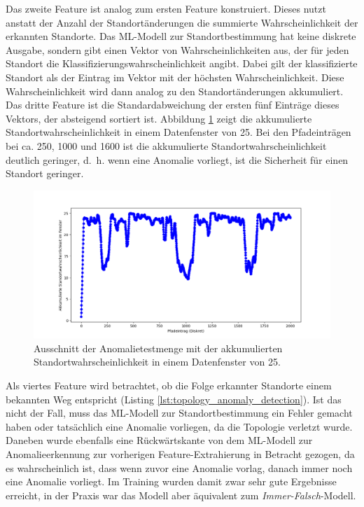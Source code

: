 \newline
\newline
Das zweite Feature ist analog zum ersten Feature konstruiert.
Dieses nutzt anstatt der Anzahl der Standortänderungen die summierte Wahrscheinlichkeit der erkannten Standorte.
Das ML-Modell zur Standortbestimmung hat keine diskrete Ausgabe, sondern gibt einen Vektor von Wahrscheinlichkeiten aus,
der für jeden Standort die Klassifizierungswahrscheinlichkeit angibt.
Dabei gilt der klassifizierte Standort als der Eintrag im Vektor mit der höchsten Wahrscheinlichkeit.
Diese Wahrscheinlichkeit wird dann analog zu den Standortänderungen akkumuliert.
Das dritte Feature ist die Standardabweichung der ersten fünf Einträge dieses Vektors, der absteigend sortiert ist.
Abbildung \ref{fig:window_confidence} zeigt die akkumulierte Standortwahrscheinlichkeit in einem Datenfenster von 25.
Bei den Pfadeinträgen bei ca. 250, 1000 und 1600 ist die akkumulierte Standortwahrscheinlichkeit deutlich geringer,
d.~h. wenn eine Anomalie vorliegt, ist die Sicherheit für einen Standort geringer.
\begin{figure}[h!]
    \centering
    \includegraphics[width=\linewidth]{images/feature_window_confidence.png}
    \caption{Ausschnitt der Anomalietestmenge mit der akkumulierten Standortwahrscheinlichkeit in einem Datenfenster von 25.}
    \label{fig:window_confidence}
\end{figure}
\newline
\newline
Als viertes Feature wird betrachtet, ob die Folge erkannter Standorte einem bekannten Weg entspricht (Listing \ref{lst:topology_anomaly_detection}).
Ist das nicht der Fall, muss das ML-Modell zur Standortbestimmung ein Fehler gemacht haben
oder tatsächlich eine Anomalie vorliegen, da die Topologie verletzt wurde.
\newline
\newline
Daneben wurde ebenfalls eine Rückwärtskante von dem ML-Modell zur Anomalieerkennung zur vorherigen Feature-Extrahierung in Betracht gezogen,
da es wahrscheinlich ist, dass wenn zuvor eine Anomalie vorlag, danach immer noch eine Anomalie vorliegt.
Im Training wurden damit zwar sehr gute Ergebnisse erreicht,
in der Praxis war das Modell aber äquivalent zum \textit{Immer-Falsch}-Modell.
